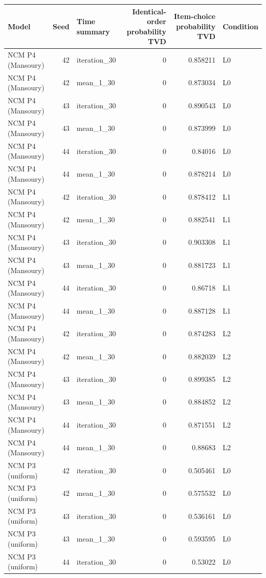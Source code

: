 \begin{table}[htbp!]
\centering
\small
\setlength{\tabcolsep}{3pt}
\renewcommand{\arraystretch}{1.1}
\begin{tabular}{lrlrrl}
\hline
Model & Seed & Time summary & Identical-order probability TVD & Item-choice probability TVD & Condition \\
\hline
NCM P4 (Mansoury) & 42 & iteration\_30 & 0 & 0.858211 & L0 \\
NCM P4 (Mansoury) & 42 & mean\_1\_30 & 0 & 0.873034 & L0 \\
NCM P4 (Mansoury) & 43 & iteration\_30 & 0 & 0.890543 & L0 \\
NCM P4 (Mansoury) & 43 & mean\_1\_30 & 0 & 0.873999 & L0 \\
NCM P4 (Mansoury) & 44 & iteration\_30 & 0 & 0.84016 & L0 \\
NCM P4 (Mansoury) & 44 & mean\_1\_30 & 0 & 0.878214 & L0 \\
NCM P4 (Mansoury) & 42 & iteration\_30 & 0 & 0.878412 & L1 \\
NCM P4 (Mansoury) & 42 & mean\_1\_30 & 0 & 0.882541 & L1 \\
NCM P4 (Mansoury) & 43 & iteration\_30 & 0 & 0.903308 & L1 \\
NCM P4 (Mansoury) & 43 & mean\_1\_30 & 0 & 0.881723 & L1 \\
NCM P4 (Mansoury) & 44 & iteration\_30 & 0 & 0.86718 & L1 \\
NCM P4 (Mansoury) & 44 & mean\_1\_30 & 0 & 0.887128 & L1 \\
NCM P4 (Mansoury) & 42 & iteration\_30 & 0 & 0.874283 & L2 \\
NCM P4 (Mansoury) & 42 & mean\_1\_30 & 0 & 0.882039 & L2 \\
NCM P4 (Mansoury) & 43 & iteration\_30 & 0 & 0.899385 & L2 \\
NCM P4 (Mansoury) & 43 & mean\_1\_30 & 0 & 0.884852 & L2 \\
NCM P4 (Mansoury) & 44 & iteration\_30 & 0 & 0.871551 & L2 \\
NCM P4 (Mansoury) & 44 & mean\_1\_30 & 0 & 0.88683 & L2 \\
NCM P3 (uniform) & 42 & iteration\_30 & 0 & 0.505461 & L0 \\
NCM P3 (uniform) & 42 & mean\_1\_30 & 0 & 0.575532 & L0 \\
NCM P3 (uniform) & 43 & iteration\_30 & 0 & 0.536161 & L0 \\
NCM P3 (uniform) & 43 & mean\_1\_30 & 0 & 0.593595 & L0 \\
NCM P3 (uniform) & 44 & iteration\_30 & 0 & 0.53022 & L0 \\

\end{tabular}
\end{table}
